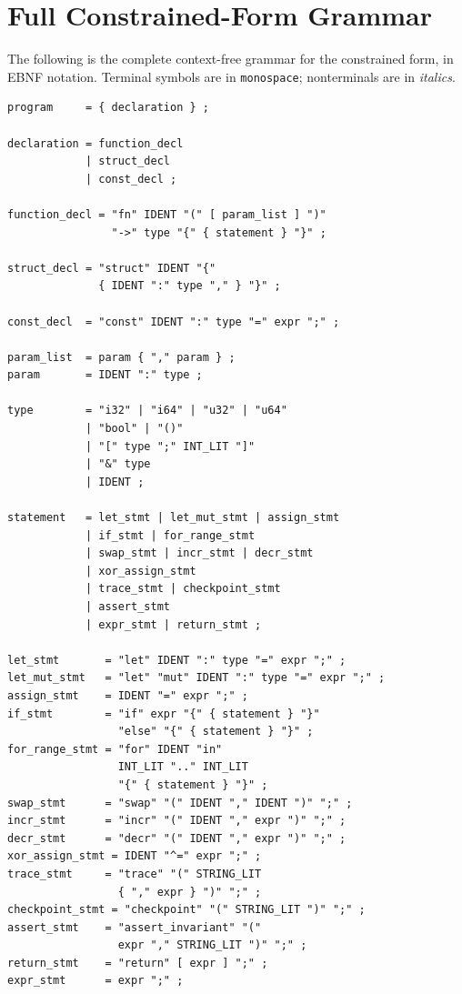 \documentclass[11pt,a4paper]{article}
\begin{document}
\appendix

\section{Full Constrained-Form Grammar}
\label{app:grammar}

The following is the complete context-free grammar for the constrained form,
in EBNF notation.  Terminal symbols are in \texttt{monospace}; nonterminals
are in \textit{italics}.

\begin{lstlisting}[language={},basicstyle=\ttfamily\footnotesize,frame=single,
  backgroundcolor=\color{gray!3}]
program     = { declaration } ;

declaration = function_decl
            | struct_decl
            | const_decl ;

function_decl = "fn" IDENT "(" [ param_list ] ")"
                "->" type "{" { statement } "}" ;

struct_decl = "struct" IDENT "{"
              { IDENT ":" type "," } "}" ;

const_decl  = "const" IDENT ":" type "=" expr ";" ;

param_list  = param { "," param } ;
param       = IDENT ":" type ;

type        = "i32" | "i64" | "u32" | "u64"
            | "bool" | "()"
            | "[" type ";" INT_LIT "]"
            | "&" type
            | IDENT ;

statement   = let_stmt | let_mut_stmt | assign_stmt
            | if_stmt | for_range_stmt
            | swap_stmt | incr_stmt | decr_stmt
            | xor_assign_stmt
            | trace_stmt | checkpoint_stmt
            | assert_stmt
            | expr_stmt | return_stmt ;

let_stmt       = "let" IDENT ":" type "=" expr ";" ;
let_mut_stmt   = "let" "mut" IDENT ":" type "=" expr ";" ;
assign_stmt    = IDENT "=" expr ";" ;
if_stmt        = "if" expr "{" { statement } "}"
                 "else" "{" { statement } "}" ;
for_range_stmt = "for" IDENT "in"
                 INT_LIT ".." INT_LIT
                 "{" { statement } "}" ;
swap_stmt      = "swap" "(" IDENT "," IDENT ")" ";" ;
incr_stmt      = "incr" "(" IDENT "," expr ")" ";" ;
decr_stmt      = "decr" "(" IDENT "," expr ")" ";" ;
xor_assign_stmt = IDENT "^=" expr ";" ;
trace_stmt     = "trace" "(" STRING_LIT
                 { "," expr } ")" ";" ;
checkpoint_stmt = "checkpoint" "(" STRING_LIT ")" ";" ;
assert_stmt    = "assert_invariant" "("
                 expr "," STRING_LIT ")" ";" ;
return_stmt    = "return" [ expr ] ";" ;
expr_stmt      = expr ";" ;
\end{lstlisting}
\end{document}

